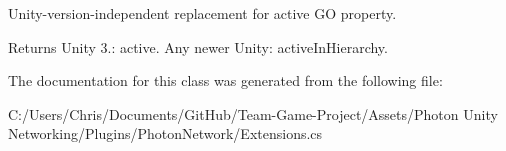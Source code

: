 Unity-\/version-\/independent replacement for active GO property. 

\begin{DoxyReturn}{Returns}
Unity 3.\+: active. Any newer Unity\+: active\+In\+Hierarchy.
\end{DoxyReturn}


The documentation for this class was generated from the following file\+:\begin{DoxyCompactItemize}
\item 
C\+:/\+Users/\+Chris/\+Documents/\+Git\+Hub/\+Team-\/\+Game-\/\+Project/\+Assets/\+Photon Unity Networking/\+Plugins/\+Photon\+Network/Extensions.\+cs\end{DoxyCompactItemize}
